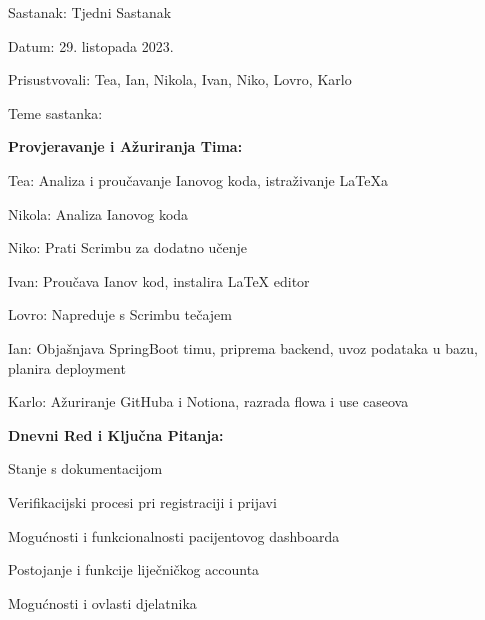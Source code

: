 \begin{packed_enum}
        \item Sastanak: Tjedni Sastanak
            \item[] \begin{packed_item}
                \item Datum: 29. listopada 2023.
                \item Prisustvovali: Tea, Ian, Nikola, Ivan, Niko, Lovro, Karlo
                \item Teme sastanka:
                    \begin{packed_item}
                        \item \textbf{Provjeravanje i Ažuriranja Tima:}
                            \begin{packed_item}
                                \item Tea: Analiza i proučavanje Ianovog koda, istraživanje LaTeXa
                                \item Nikola: Analiza Ianovog koda
                                \item Niko: Prati Scrimbu za dodatno učenje
                                \item Ivan: Proučava Ianov kod, instalira LaTeX editor
                                \item Lovro: Napreduje s Scrimbu tečajem
                                \item Ian: Objašnjava SpringBoot timu, priprema backend, uvoz podataka u bazu, planira deployment
                                \item Karlo: Ažuriranje GitHuba i Notiona, razrada flowa i use caseova
                            \end{packed_item}
                        \item \textbf{Dnevni Red i Ključna Pitanja:}
                            \begin{packed_item}
                                \item Stanje s dokumentacijom
                                \item Verifikacijski procesi pri registraciji i prijavi
                                \item Mogućnosti i funkcionalnosti pacijentovog dashboarda
                                \item Postojanje i funkcije liječničkog accounta
                                \item Mogućnosti i ovlasti djelatnika
                            \end{packed_item}

\end{packed_item}
\end{packed_item}
\end{packed_enum}
